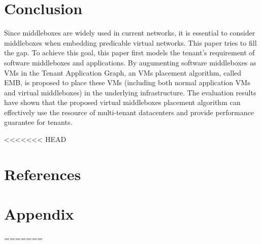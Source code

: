 \documentclass[review]{elsarticle}
\begin{document}

\section{Conclusion}\label{sec:final}
Since middleboxes are widely used in current networks, it is essential to consider middleboxes when embedding predicable virtual networks. This paper tries to fill the gap. To achieve this goal, this paper first models the tenant's requirement of software middleboxes and applications. By augumenting software middleboxes as VMs in the Tenant Application Graph, an VMs placement algorithm, called EMB, is proposed to place these VMs (including both normal application VMs and virtual middleboxes) in the underlying infrastructure. The evaluation results have shown that the proposed virtual middleboxes placement algorithm can effectively use the resource of multi-tenant datacenters and provide performance guarantee for tenants.   

 





<<<<<<< HEAD
\section*{References}
%

\section*{Appendix}
=======
\end{document}
